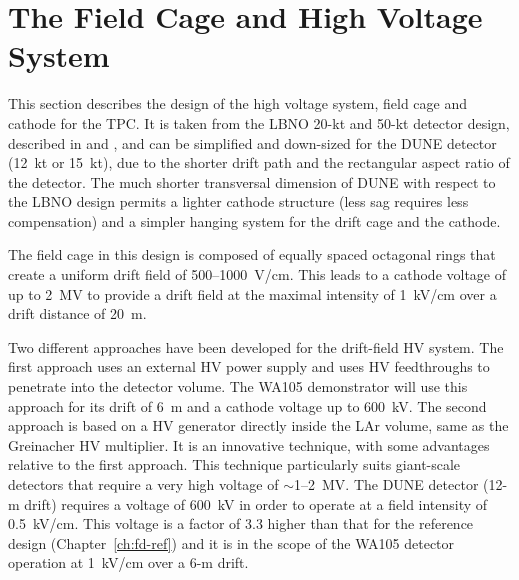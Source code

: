 \section{The Field Cage and High Voltage System} 
\label{sec:detectors-fd-alt-hv}

This section describes the design of the high voltage system, field
cage and cathode for the TPC.  It is taken from the 
LBNO 20-kt and 50-kt detector design, described in \anxlbnoa and \anxlbnob,
and can be simplified and down-sized for the DUNE detector 
(12~kt or 15~kt), %
due to the shorter drift path and the rectangular aspect ratio of the
detector. The much shorter transversal dimension of DUNE with respect to the LBNO design
permits a lighter cathode structure (less sag requires less compensation) 
and a simpler hanging system for the drift cage and the cathode.

The field cage in this design is
composed of equally spaced octagonal rings that create a uniform
drift field of 500--1000~V/cm. This leads to a cathode voltage of up to 2~MV 
to provide a drift field at
the maximal intensity of 1~kV/cm over a drift distance of 20~m. 

Two different approaches have been developed %
for the
drift-field HV system. The first approach uses an external HV power supply
and uses HV feedthroughs to penetrate into the detector volume.
The  WA105 demonstrator will use this
approach %
for its drift
of 6~m and a cathode voltage up to 600~kV.  The second approach is
based on a HV generator directly inside the LAr volume,  same
as the Greinacher HV multiplier. It is an innovative technique, 
with
some advantages relative to the first approach. This technique
particularly suits giant-scale detectors that require a very high voltage of
$\sim$1--2~MV. The DUNE detector (12-m drift) requires a voltage
of 600~kV  in order to operate at a field intensity of
0.5~kV/cm. This voltage is a factor of 3.3 higher than that for %
the reference design (Chapter~\ref{ch:fd-ref}) and it is in the scope of the WA105 detector
operation at 1~kV/cm over a 6-m drift. 

